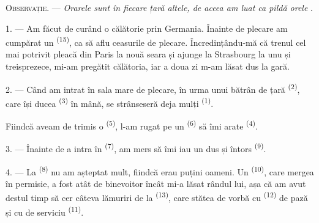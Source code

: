 %

\VUsaut{4.0mm}
\VUsaut{2.4mm}
\VUsaut{3.4mm}
\textsc{Observație.} --- \textit{Orarele sunt în fiecare țară altele, de aceea am
luat ca pildă orele} .

1. --- Am făcut de curând o călătorie prin Germania. Înainte de plecare am cumpărat
un  \textsuperscript{(15)}, ca să aflu ceasurile de
plecare. Încredințându-mă că trenul cel mai potrivit pleacă din Paris la nouă seara
și ajunge la Strasbourg la unu și treisprezece, mi-am pregătit călătoria, iar a
doua zi m-am lăsat dus la gară.

2. --- Când am intrat în sala mare de plecare, în urma unui bătrân 
de țară \textsuperscript{(2)}, care își ducea 
\textsuperscript{(3)} în mână, se strânseseră deja mulți 
\textsuperscript{(1)}.

Fiindcă aveam de trimis o  \textsuperscript{(5)}, l-am rugat pe un
 \textsuperscript{(6)} să îmi arate 
\textsuperscript{(4)}.

3. --- Înainte de a intra în  \textsuperscript{(7)}, am
mers să îmi iau un  dus și întors \textsuperscript{(9)}.

4. --- La  \textsuperscript{(8)} nu am așteptat mult, fiindcă erau
puțini oameni. Un  \textsuperscript{(10)}, care mergea în permisie,
a fost atât de binevoitor încât mi-a lăsat rândul lui, așa că am avut destul timp
să cer câteva lămuriri de la  \textsuperscript{(13)}, care
stătea de vorbă cu  \textsuperscript{(12)} de pază și cu
 de serviciu \textsuperscript{(11)}.

